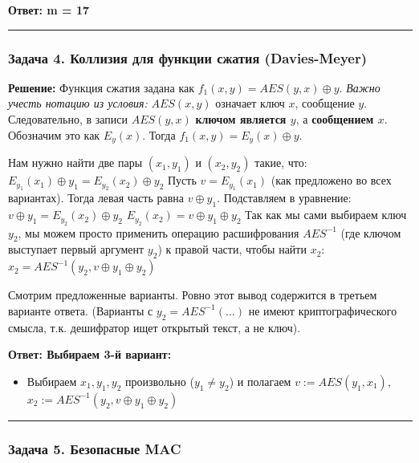 \textbf{Ответ: m = 17}

\begin{center}\rule{0.5\linewidth}{0.5pt}\end{center}

\subsubsection{Задача 4. Коллизия для функции сжатия (Davies-Meyer)}\label{ux437ux430ux434ux430ux447ux430-4.-ux43aux43eux43bux43bux438ux437ux438ux44f-ux434ux43bux44f-ux444ux443ux43dux43aux446ux438ux438-ux441ux436ux430ux442ux438ux44f-davies-meyer}

\textbf{Решение:} Функция сжатия задана как \(f_1(x,y) = AES(y,x) \oplus y\). \emph{Важно учесть нотацию из условия:} \(AES(x,y)\) означает ключ \(x\), сообщение \(y\). Следовательно, в записи \(AES(y,x)\) \textbf{ключом является \(y\)}, а \textbf{сообщением \(x\)}. Обозначим это как \(E_y(x)\). Тогда \(f_1(x,y) = E_y(x) \oplus y\).

Нам нужно найти две пары \((x_1, y_1)\) и \((x_2, y_2)\) такие, что: \(E_{y_1}(x_1) \oplus y_1 = E_{y_2}(x_2) \oplus y_2\) Пусть \(v = E_{y_1}(x_1)\) (как предложено во всех вариантах). Тогда левая часть равна \(v \oplus y_1\). Подставляем в уравнение: \(v \oplus y_1 = E_{y_2}(x_2) \oplus y_2\) \(E_{y_2}(x_2) = v \oplus y_1 \oplus y_2\) Так как мы сами выбираем ключ \(y_2\), мы можем просто применить операцию расшифрования \(AES^{-1}\) (где ключом выступает первый аргумент \(y_2\)) к правой части, чтобы найти \(x_2\): \(x_2 = AES^{-1}(y_2, v \oplus y_1 \oplus y_2)\)

Смотрим предложенные варианты. Ровно этот вывод содержится в третьем варианте ответа. (Варианты с \(y_2 = AES^{-1}(...)\) не имеют криптографического смысла, т.к. дешифратор ищет открытый текст, а не ключ).

\textbf{Ответ: Выбираем 3-й вариант:}

\begin{itemize}
\tightlist
\item
  Выбираем \(x_1, y_1, y_2\) произвольно (\(y_1 \neq y_2\)) и полагаем \(v := AES(y_1, x_1)\), \(x_2 := AES^{-1}(y_2, v \oplus y_1 \oplus y_2)\)
\end{itemize}

\begin{center}\rule{0.5\linewidth}{0.5pt}\end{center}

\subsubsection{Задача 5. Безопасные MAC}\label{ux437ux430ux434ux430ux447ux430-5.-ux431ux435ux437ux43eux43fux430ux441ux43dux44bux435-mac}

